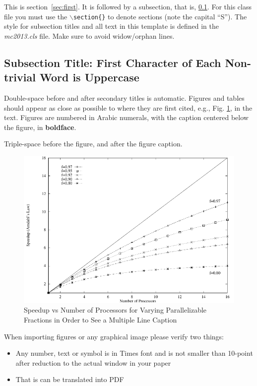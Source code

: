 \documentclass{ansjournal}
\begin{document}
This is section~\ref{sec:first}. It is followed by a subsection, that is,
\ref{sec:second}. For this class file you must use the
\texttt{$\backslash$section\{\}} to denote sections (note the capital ``S'').
The style for subsection titles and all text in this template is defined in
the {\it mc2013.cls} file.  Make sure to avoid widow/orphan lines.


\subsection{Subsection Title: First Character of Each Non-trivial Word is
Uppercase}
\label{sec:second}

Double-space before and after secondary titles is automatic.  Figures and
tables should appear as close as possible to where they are first
cited, e.g., Fig. \ref{fig:amdahl}, in the text.  Figures are numbered in
Arabic numerals, with the caption centered below the figure, in
{\bf boldface}.

Triple-space before the figure, and after the figure caption.

%
\vspace{16pt}
\begin{figure}[!htb]
\begin{spacing}{1.0}
\centering
\includegraphics[scale=0.60]{figure}
\caption{Speedup vs Number of Processors for Varying Parallelizable Fractions in
  Order to See a Multiple Line Caption}
\label{fig:amdahl}
\end{spacing}
\end{figure}
\vspace{16pt}
%

When importing figures or any graphical image please verify two things:
\begin{itemize}
\item Any number, text or symbol is in Times font and is not smaller than
    10-point after reduction to the actual window in your paper
\item That is can be translated into PDF
\end{itemize}
\end{document}
